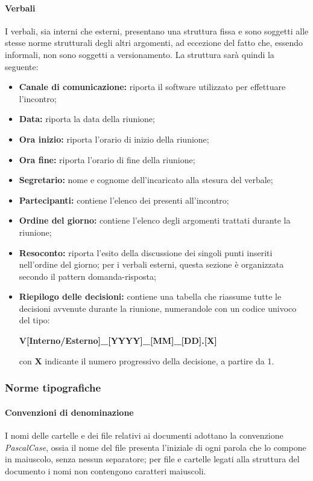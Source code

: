 \paragraph{Verbali}      
I verbali, sia interni che esterni, presentano una struttura fissa e sono soggetti alle stesse norme strutturali degli altri argomenti, ad eccezione del fatto che, essendo informali, non sono soggetti a versionamento.
La struttura sarà quindi la seguente:
\begin{itemize}
	\item \textbf{Canale di comunicazione:} riporta il software utilizzato per effettuare l'incontro;
	\item \textbf{Data:} riporta la data della riunione;
	\item \textbf{Ora inizio:} riporta l'orario di inizio della riunione;
	\item \textbf{Ora fine:} riporta l'orario di fine della riunione;
	\item \textbf{Segretario:} nome e cognome dell'incaricato alla stesura del verbale;
	\item \textbf{Partecipanti:} contiene l'elenco dei presenti all'incontro;   
	\item \textbf{Ordine del giorno:} contiene l'elenco degli argomenti trattati durante la riunione;
	\item \textbf{Resoconto:} riporta l'esito della discussione dei singoli punti inseriti nell'ordine del giorno; per i verbali esterni, questa sezione è organizzata secondo il pattern domanda-risposta;
	\item \textbf{Riepilogo delle decisioni:} contiene una tabella che riassume tutte le decisioni avvenute durante la riunione, numerandole con un codice univoco del tipo: \newline 
	\centerline{\textbf{V[Interno/Esterno]\_[YYYY]\_[MM]\_[DD].[X]}}\newline con \textbf{X} indicante il numero progressivo della decisione, a partire da 1.
\end{itemize}
\subsubsection{Norme tipografiche}
\paragraph{Convenzioni di denominazione}   
I nomi delle cartelle e dei file relativi ai documenti adottano la convenzione \textit{PascalCase}, ossia il nome del file presenta l'iniziale di ogni parola che lo compone in maiuscolo, senza nessun separatore; per file e cartelle legati alla struttura del documento i nomi non contengono caratteri maiuscoli.
